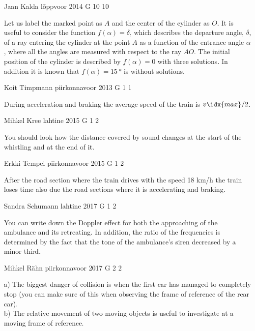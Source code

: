 \documentclass[11pt]{article}
\begin{document}
{Jaan Kalda} %
{lõppvoor} %
{2014} %
{G 10} %
{10} %
{

\ifEngHint
Let us label the marked point as $A$ and the center of the cylinder as $O$. It is useful to consider the function $f(\alpha) = \delta$, which describes the departure angle, $\delta$, of a ray entering the cylinder at the point $A$ as a function of the entrance angle $\alpha$, where all the angles are measured with respect to the ray $AO$. The initial position of the cylinder is described by $f(\alpha) = 0$ with three solutions. In addition it is known that $f(\alpha) = \SI{15}{\degree}$ is without solutions.
\fi
}

{Koit Timpmann} %
{piirkonnavoor} %
{2013} %
{G 1} %
{1} %
{

\ifEngHint
During acceleration and braking the average speed of the train is $v\idx{max}/2$.
\fi
}

{Mihkel Kree} %
{lahtine} %
{2015} %
{G 1} %
{2} %
{

\ifEngHint
You should look how the distance covered by sound changes at the start of the whistling and at the end of it.
\fi
}

{Erkki Tempel} %
{piirkonnavoor} %
{2015} %
{G 1} %
{2} %
{

\ifEngHint
After the road section where the train drives with the speed 18 km/h the train loses time also due the road sections where it is accelerating and braking.
\fi
}

{Sandra Schumann} %
{lahtine} %
{2017} %
{G 1} %
{2} %
{

\ifEngHint
You can write down the Doppler effect for both the approaching of the ambulance and its retreating. In addition, the ratio of the frequencies is determined by the fact that the tone of the ambulance’s siren decreased by a minor third.
\fi
}

{Mihkel Rähn} %
{piirkonnavoor} %
{2017} %
{G 2} %
{2} %
{

\ifEngHint
a) The biggest danger of collision is when the first car has managed to completely stop (you can make sure of this when observing the frame of reference of the rear car).\\
b) The relative movement of two moving objects is useful to investigate at a moving frame of reference.
\fi
}
\end{document}
